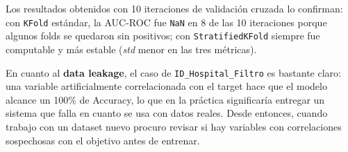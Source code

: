 \documentclass[../../__memoria.tex]{subfiles}
\begin{document}
Los resultados obtenidos con 10 iteraciones de validación cruzada lo
confirman: con \texttt{KFold} estándar, la AUC-ROC fue \texttt{NaN} en
8 de las 10 iteraciones porque algunos folds se quedaron sin positivos;
con \texttt{StratifiedKFold} siempre fue computable y más estable
(\textit{std} menor en las tres métricas).

En cuanto al \textbf{data leakage}, el caso de \texttt{ID\_Hospital\_Filtro}
es bastante claro: una variable artificialmente correlacionada con el
target hace que el modelo alcance un 100\% de Accuracy, lo que en
la práctica significaría entregar un sistema que falla en cuanto
se usa con datos reales. Desde entonces, cuando trabajo con un dataset nuevo procuro revisar si hay variables con correlaciones sospechosas con el objetivo antes de entrenar.
\end{document}
